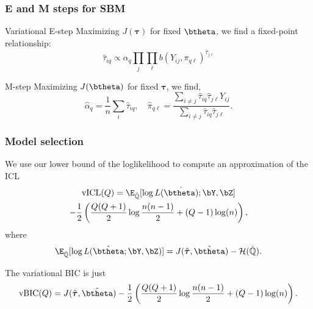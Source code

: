 \documentclass{beamer}\usepackage[]{graphicx}\usepackage[]{color}
\begin{document}
\begin{frame}
  \frametitle{E and M steps for SBM}

  \begin{block}{Variational E-step}
    Maximizing $J(\boldsymbol\tau)$ for fixed $\btheta$, we find a fixed-point relationship:
    \begin{equation*}
      \hat{\tau}_{iq} \varpropto \alpha_q \prod_{j} \prod_{\ell} b(Y_{ij}, \pi_{q\ell})^{\hat{\tau}_{j\ell}}
    \end{equation*}
  \end{block}

  \vfill

  \begin{block}{M-step}
    Maximizing $J(\btheta)$ for fixed $\boldsymbol\tau$, we find,
    \begin{equation*}
\hat{\alpha}_q = \frac{1}{n}\sum_i \hat{\tau}_{iq} , \quad \hat\pi_{q\ell} = \frac{\sum_{i\neq j} \hat{\tau}_{iq}\hat{\tau}_{j\ell} Y_{ij}}{\sum_{i\neq j} \hat{\tau}_{iq}\hat{\tau}_{j\ell}}.
\end{equation*}
  \end{block}

\end{frame}

\begin{frame}
  \frametitle{Model selection}

  We use our lower bound of the  loglikelihood to compute an approximation of the ICL
  \begin{multline*}
  \mathrm{vICL}(Q) = \E_{\hat{\mathbb{Q}}} [\log L(\hat{\btheta)};\bY,\bZ] \\ - \frac{1}{2} \left(\frac{Q(Q+1)}{2} \log \frac{n(n-1)}{2} + (Q-1) \log (n) \right),
\end{multline*}
where
    \begin{equation*}
      \E_{\hat{\mathbb{Q}}} [\log L(\hat\btheta; \bY,\bZ)] = J(\hat{\boldsymbol\tau},\hat\btheta) - \mathcal{H}(\hat{\mathbb{Q}}).
    \end{equation*}

    The variational BIC is just
    \begin{equation*}
  \mathrm{vBIC}(Q) = J(\hat{\boldsymbol\tau},\hat\btheta) - \frac{1}{2} \left(\frac{Q(Q+1)}{2} \log \frac{n(n-1)}{2} + (Q-1) \log (n) \right).
    \end{equation*}

\end{frame}
\end{document}
